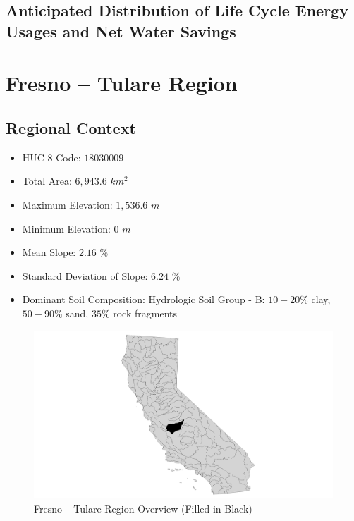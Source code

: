     \subsection{Anticipated Distribution of Life Cycle Energy Usages and Net Water Savings}

\clearpage

\section{Fresno -- Tulare Region}

    \subsection{Regional Context}

    \begin{itemize}
      \setlength{\itemsep}{0cm}
      \setlength{\parskip}{0cm}
        \item HUC-8 Code: $18030009$
        \item Total Area: $6,943.6$ $km^2$
        \item Maximum Elevation: $1,536.6$ $m$
        \item Minimum Elevation: $0$ $m$
        \item Mean Slope: $2.16$ $\%$
        \item Standard Deviation of Slope: $6.24$ $\%$
        \item Dominant Soil Composition: Hydrologic Soil Group - B: $10-20\%$ clay, $50-90\%$ sand, $35\%$ rock fragments
    \end{itemize}

        \begin{figure}[!h]
            \begin{center}
            \includegraphics[width=5.5in]{figures/Fresno_Overview.png}   
            \caption{Fresno -- Tulare Region Overview (Filled in Black)}
            \label{fig:Foverview}
            \end{center}
        \end{figure}

